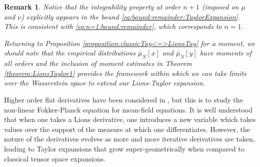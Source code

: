\documentclass[a4paper,11pt,twoside]{article}
\numberwithin{equation}{section}
\theoremstyle{plain}
\newtheorem{remark}[theorem]{Remark}
\newcommand{\1}{\mathbbm{1}}
\begin{document}
	\begin{remark}
		Notice that the integrability property at order $n+1$ (imposed on $\mu$ and $\nu$) explicitly appears in the bound \eqref{eq:bound:remainder:TaylorExpansion}. This is consistent with \eqref{eq:n=1:bound:remainder}, which corresponds to $n=1$.  
		
		Returning to Proposition \ref{proposition:classicTay<=>LionsTay} for a moment, we should note that the empirical distributions $\bar{\mu}_N[x]$ and $\bar{\mu}_N[y]$ have moments of all orders and the inclusion of moment estimates in Theorem \ref{theorem:LionsTaylor1} provides the framework within which we can take limits over the Wasserstein space to extend our Lions-Taylor expansion. 
	\end{remark}
	
	Higher order flat derivatives have been considered in \cite{TseHigher2021}, but this is to study the non-linear Fokker-Planck equation for mean-field equations. It is well understood that when one takes a Lions derivative, one introduces a new variable which takes values over the support of the measure at which one differentiates. However, the nature of the derivatives evolves as more and more iterative derivatives are taken, leading to Taylor expansions that grow super-geometrically when compared to classical tensor space expansions. 
	
\end{document}
